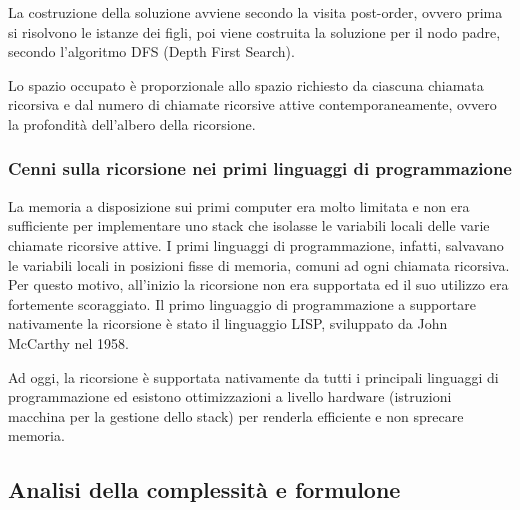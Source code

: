 La costruzione della soluzione avviene secondo la visita post-order, ovvero prima si risolvono le istanze dei figli, poi
viene costruita la soluzione per il nodo padre, secondo l'algoritmo DFS (Depth First Search).

Lo spazio occupato è proporzionale allo spazio richiesto da ciascuna chiamata ricorsiva e dal numero di chiamate ricorsive
attive contemporaneamente, ovvero la profondità dell'albero della ricorsione.

\subsubsection*{Cenni sulla ricorsione nei primi linguaggi di programmazione}
La memoria a disposizione sui primi computer era molto limitata e non era sufficiente per implementare uno stack che isolasse
le variabili locali delle varie chiamate ricorsive attive. I primi linguaggi di programmazione, infatti, salvavano le variabili
locali in posizioni fisse di memoria, comuni ad ogni chiamata ricorsiva. Per questo motivo, all'inizio la ricorsione non era
supportata ed il suo utilizzo era fortemente scoraggiato. Il primo linguaggio di programmazione a supportare nativamente la
ricorsione è stato il linguaggio LISP, sviluppato da John McCarthy nel 1958.

Ad oggi, la ricorsione è supportata nativamente da tutti i principali linguaggi di programmazione ed esistono ottimizzazioni
a livello hardware (istruzioni macchina per la gestione dello stack) per renderla efficiente e non sprecare memoria.

\subsection{Analisi della complessità e formulone}
